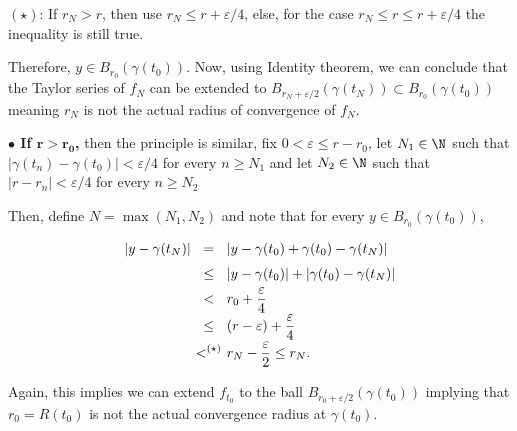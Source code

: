 $(\star)$: If $r_N > r$, then use $r_N \leq r + \varepsilon/4$, else, for the case $r_N \leq r \leq r + \varepsilon/4$ the inequality is still true.

Therefore, $y \in B_{r_0}(\gamma(t_0))$. Now, using Identity theorem, we can conclude that the Taylor series of $f_N$ can be extended to $B_{r_N + \varepsilon/2}(\gamma(t_N)) \subset B_{r_0}(\gamma(t_0))$ meaning $r_N$ is not the actual radius of convergence of $f_N$.

\textbf{$\boldsymbol{\bullet}$ If $\boldsymbol{r > r_0}$,} then the principle is similar, fix $0 < \varepsilon \leq r - r_0$, let $N_1 \in \N$ such that $|\gamma(t_n) - \gamma(t_0)| < \varepsilon/4$ for every $n \geq N_1$ and let $N_2 \in \N$ such that $|r-r_n| < \varepsilon/4$ for every $n \geq N_2$

\begin{figure}[H]
    \centering
    
\end{figure} 

Then, define $ N = \max(N_1, N_2)$ and note that for every $y \in B_{r_0}(\gamma(t_0))$,
\[ \everymath{\displaystyle}
\arraycolsep=1.8pt\def\arraystretch{1.5}
\begin{array}{rcl}
    |y - \gamma(t_N)| & = & |y - \gamma(t_0) + \gamma(t_0) - \gamma(t_N)|\\
    & \leq & |y - \gamma(t_0)| + |\gamma(t_0) - \gamma(t_N)|\\
    & < & r_0 + \frac{\varepsilon}{4}\\
    & \leq & (r-\varepsilon) + \frac{\varepsilon}{4}\\
    & <^{(\star)} & r_N - \frac{\varepsilon}{2} \leq r_N.
\end{array}  \] 

Again, this implies we can extend $f_{t_0}$ to the ball $B_{r_0 + \varepsilon/2}(\gamma(t_0))$ implying that $r_0 = R(t_0)$ is not the actual convergence radius at $\gamma(t_0)$.